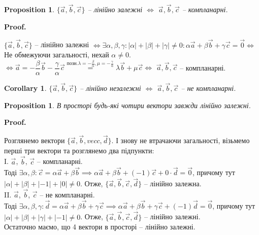 \documentclass[a4paper, 10pt]{extarticle}
\makeatletter
\def\qed{$\blacksquare$}
\def\qed{$\blacksquare$}
\theoremstyle{theoremdd}
\theoremstyle{theoremdd}
\theoremstyle{theoremdd}
\theoremstyle{theoremdd}
\theoremstyle{theoremdd}
\newtheorem{proposition}[theorem]{Proposition}
\theoremstyle{theoremdd}
\theoremstyle{theoremdd}
\theoremstyle{theoremdd}
\newtheorem{corollary}[theorem]{Corollary}
\renewenvironment{proof}[1][Proof.\\]{\par
\pushQED{\hfill \qed}%
\normalfont \topsep6\p@\@plus6\p@\relax
\trivlist
\item\relax
{\bfseries
#1\@addpunct{.}}\hspace\labelsep\ignorespaces
}{%
\popQED\endtrivlist\@endpefalse
}
\makeatother
\begin{document}
\begin{proposition}
$\{\vec{a},\vec{b},\vec{c} \}$ -- лінійно залежні $\iff$ $\vec{a},\vec{b},\vec{c}$ -- компланарні.
\end{proposition}

\begin{proof}
	$\{\vec{a},\vec{b},\vec{c}\}$ -- лінійно залежні $\iff \exists \alpha, \beta, \gamma: |\alpha| + |\beta| + |\gamma| \neq 0: \alpha \vec{a} + \beta \vec{b} + \gamma \vec{c} = \vec{0} \boxed{\iff}$\\
	Не обмежуючи загальності, нехай $\alpha \neq 0$.\\
$\boxed{\iff} \vec{a} = -\dfrac{\beta}{\alpha} \vec{b} - \dfrac{\gamma}{\alpha} \vec{c} \overset{\textrm{позн.} \lambda = -\frac{\beta}{\alpha}, \mu = -\frac{\gamma}{\alpha}}{=} \lambda \vec{b} + \mu \vec{c} \iff$ $\vec{a},\vec{b},\vec{c}$ -- компланарні.
\end{proof}

\begin{corollary}
	$\{\vec{a},\vec{b},\vec{c}\}$ -- лінійно незалежні $\iff$ $\vec{a},\vec{b},\vec{c}$ -- не компланарні.
\end{corollary}

\begin{proposition}
	В просторі будь-які чотири вектори завжди лінійно залежні.
\end{proposition}

\begin{proof}
	Розглянемо вектори $\{\vec{a},\vec{b},vec{c},\vec{d}\}$. І знову не втрачаючи загальності, візьмемо перші три вектори та розглянемо два підпункти:\\
	I. $\vec{a}$, $\vec{b}$, $\vec{c}$ -- компланарні.\\
	Тоді $\exists \alpha, \beta: \vec{c} = \alpha \vec{a} + \beta \vec{b} \implies \alpha \vec{a} + \beta \vec{b} + (-1)\vec{c} + 0 \cdot \vec{d} = \vec{0}$, причому тут $|\alpha| + |\beta| + |-1| + |0| \neq 0$. Отже, $\{\vec{a}, \vec{b}, \vec{c}, \vec{d}\}$ -- лінійно залежна.
	\bigskip \\
	II. $\vec{a}$, $\vec{b}$, $\vec{c}$ -- не компланарні.\\
	Тоді $\exists \alpha, \beta, \gamma: \vec{d} = \alpha \vec{a} + \beta \vec{b} + \gamma \vec{c} \implies \alpha \vec{a} + \beta \vec{b} + \gamma \vec{c} + (-1)\vec{d} = \vec{0}$, причому тут $|\alpha| + |\beta| + |\gamma| + |-1| \neq 0$. Отже, $\{\vec{a}, \vec{b}, \vec{c}, \vec{d}\}$ -- лінійно залежні.\\
	Остаточно маємо, що 4 вектори в просторі -- лінійно залежні.
\end{proof}
\end{document}
